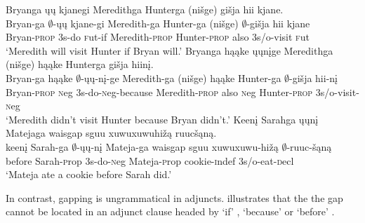 \documentclass[output=paper]{LSP/langsci}
\begin{document}
\ea\label{ex:johnson:35}
\ea\label{ex:johnson:35a}
\glll Bryanga ųų kjanegi Meredithga Hunterga (nišge) {gišja hii} kjane.\\
Bryan-ga $\emptyset$-ųų kjane-gi Meredith-ga Hunter-ga (nišge) $\emptyset$-{gišja hii} kjane\\
Bryan-\textsc{prop} {\textsc 3s}-do {\textsc fut}-if Meredith-\textsc{prop} Hunter-\textsc{prop} also {\textsc 3s/o}-visit {\textsc fut}\\
\trans `Meredith will visit Hunter if Bryan will.'
\ex\label{ex:johnson:35b}
\glll Bryanga hąąke ųųnįge Meredithga (nišge) hąąke Hunterga {gišja hiinį}.\\
Bryan-ga hąąke $\emptyset$-ųų-nį-ge Meredith-ga (nišge) hąąke Hunter-ga $\emptyset$-{gišja hii-nį}\\
Bryan-\textsc{prop} {\textsc neg} {\textsc 3s}-do-{\textsc neg}-because Meredith-\textsc{prop} also {\textsc neg} Hunter-\textsc{prop} {\textsc 3s/o}-visit-{\textsc neg}\\
\trans `Meredith didn't visit Hunter because Bryan didn't.'
\ex\label{ex:johnson:35c}
\glll Keenį Sarahga ųųnį Matejaga {waisgap sguu xuwuxuwuhižą} ruucšąną.\\
keenį Sarah-ga $\emptyset$-ųų-nį Mateja-ga {waisgap sguu xuwuxuwu-hižą} $\emptyset$-ruuc-šąną\\
before Sarah-{\textsc prop} {\textsc 3s}-do-{\textsc neg} Mateja-{\textsc prop} cookie-{\textsc indef} {\textsc 3s/o}-eat-{\textsc decl}\\
\trans `Mateja ate a cookie before Sarah did.'
\z
\z

In contrast, gapping is ungrammatical in adjuncts.  illustrates that the the gap cannot be located in an adjunct clause headed by `if' , `because'  or `before' .
\end{document}
